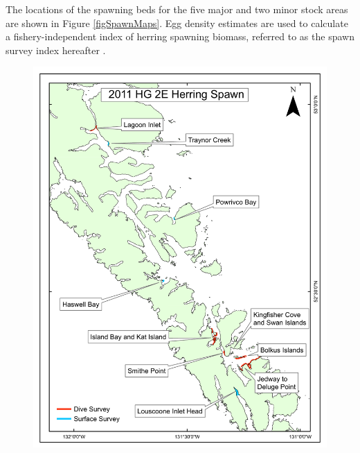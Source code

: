 The locations of the spawning beds for the five major and two minor stock areas are shown in Figure \ref{figSpawnMaps}.  Egg density estimates are used to calculate a fishery-independent index of herring spawning biomass, referred to as the spawn survey index hereafter \citep{schweigert2001stock}.

\begin{figure}[!tbp]
	\centering
	\includegraphics[scale=0.35]{../Figs/PBSfigs/2011_spawn_HG_2E_July13.pdf}

\end{figure}
